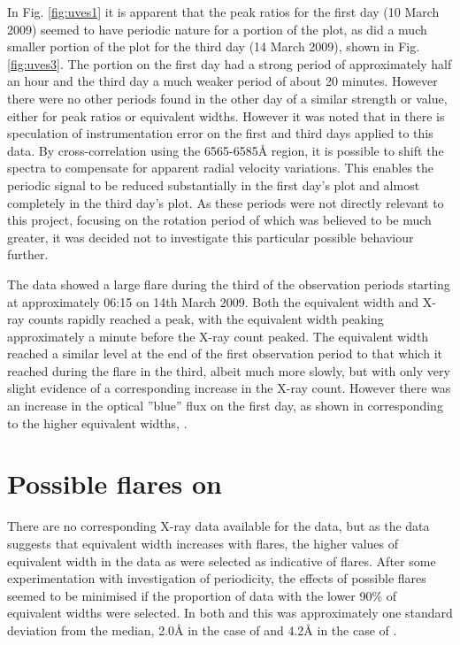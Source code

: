 In Fig. \ref{fig:uves1} it is apparent that the peak ratios for the first day (10 March 2009) seemed to have periodic
nature for a portion of the plot, as did a much smaller portion of the plot for the third day (14 March 2009), shown in
Fig. \ref{fig:uves3}. The portion on the first day had a strong period of approximately half an hour and the third day a
much weaker period of about 20 minutes.  However there were no other periods found in the other day of a similar
strength or value, either for peak ratios or equivalent widths. However it was noted that in \citet[Section
4.1]{barnes14} there is speculation of instrumentation error on the first and third days applied to this data. By
cross-correlation using the 6565-6585{\AA} region, it is possible to shift the spectra to compensate for apparent radial
velocity variations. This enables the periodic signal to be reduced substantially in the first day's plot and almost
completely in the third day's plot. As these periods were not directly relevant to this project, focusing on the
rotation period of {\prox} which was believed to be much greater, it was decided not to investigate this particular
possible behaviour further.

The {\uves} data showed a large flare during the third of the observation periods starting at approximately 06:15 on
14th March 2009. Both the equivalent width and X-ray counts rapidly reached a peak, with the equivalent width peaking
approximately a minute before the X-ray count peaked. The equivalent width reached a similar level at the end of the
first observation period to that which it reached during the flare in the third, albeit much more slowly, but with only
very slight evidence of a corresponding increase in the X-ray count. However there was an increase in the {\uves}
optical ''blue'' flux on the first day, as shown in \citet[fig. 1]{fuhrmeister11} corresponding to the higher equivalent
widths, .

\section{Possible flares on {\harps}}
\protect\label{section:harpsflares}

There are no corresponding X-ray data available for the {\harps} data, but as the {\uves} data suggests that {\ha}
equivalent width increases with flares, the higher values of equivalent width in the {\harps} data as were selected as
indicative of flares. After some experimentation with investigation of periodicity, the effects of possible flares
seemed to be minimised if the proportion of data with the lower 90\% of equivalent widths were selected. In both {\uves}
and {\harps} this was approximately one standard deviation from the median, 2.0{\AA} in the case of {\uves} and 4.2{\AA}
in the case of {\harps}.

